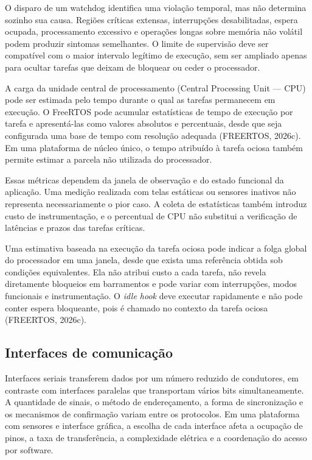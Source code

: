 \documentclass{article}
\begin{document}
O disparo de um watchdog identifica uma viola\c{c}\~ao temporal, mas n\~ao determina sozinho sua causa. Regi\~oes cr\'iticas extensas, interrup\c{c}\~oes desabilitadas, espera ocupada, processamento excessivo e opera\c{c}\~oes longas sobre mem\'oria n\~ao vol\'atil podem produzir sintomas semelhantes. O limite de supervis\~ao deve ser compat\'ivel com o maior intervalo leg\'itimo de execu\c{c}\~ao, sem ser ampliado apenas para ocultar tarefas que deixam de bloquear ou ceder o processador.


A carga da unidade central de processamento (Central Processing Unit --- CPU) pode ser estimada pelo tempo durante o qual as tarefas permanecem em execu\c{c}\~ao. O FreeRTOS pode acumular estat\'isticas de tempo de execu\c{c}\~ao por tarefa e apresent\'a-las como valores absolutos e percentuais, desde que seja configurada uma base de tempo com resolu\c{c}\~ao adequada (FREERTOS, 2026c). Em uma plataforma de n\'ucleo \'unico, o tempo atribu\'ido \`a tarefa ociosa tamb\'em permite estimar a parcela n\~ao utilizada do processador.


Essas m\'etricas dependem da janela de observa\c{c}\~ao e do estado funcional da aplica\c{c}\~ao. Uma medi\c{c}\~ao realizada com telas est\'aticas ou sensores inativos n\~ao representa necessariamente o pior caso. A coleta de estat\'isticas tamb\'em introduz custo de instrumenta\c{c}\~ao, e o percentual de CPU n\~ao substitui a verifica\c{c}\~ao de lat\^encias e prazos das tarefas cr\'iticas.


Uma estimativa baseada na execu\c{c}\~ao da tarefa ociosa pode indicar a folga global do processador em uma janela, desde que exista uma refer\^encia obtida sob condi\c{c}\~oes equivalentes. Ela n\~ao atribui custo a cada tarefa, n\~ao revela diretamente bloqueios em barramentos e pode variar com interrup\c{c}\~oes, modos funcionais e instrumenta\c{c}\~ao. O \emph{idle hook} deve executar rapidamente e n\~ao pode conter espera bloqueante, pois \'e chamado no contexto da tarefa ociosa (FREERTOS, 2026c).


\subsection{Interfaces de comunica\c{c}\~ao}


Interfaces seriais transferem dados por um n\'umero reduzido de condutores, em contraste com interfaces paralelas que transportam v\'arios bits simultaneamente. A quantidade de sinais, o m\'etodo de endere\c{c}amento, a forma de sincroniza\c{c}\~ao e os mecanismos de confirma\c{c}\~ao variam entre os protocolos. Em uma plataforma com sensores e interface gr\'afica, a escolha de cada interface afeta a ocupa\c{c}\~ao de pinos, a taxa de transfer\^encia, a complexidade el\'etrica e a coordena\c{c}\~ao do acesso por software.
\end{document}
